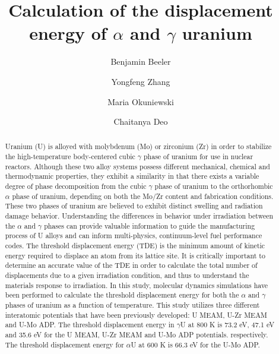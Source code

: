 \documentclass[review]{elsarticle}
\begin{document}
\begin{frontmatter}
\title{Calculation of the displacement energy of $\alpha$ and $\gamma$ uranium}

\author[inl]{Benjamin Beeler}
\author[inl]{Yongfeng Zhang}
\author[pur]{Maria Okuniewski}
\author[gatech]{Chaitanya Deo}
\address[inl]{Idaho National Laboratory, Idaho Falls, ID 83415}
\address[pur]{Purdue University, West Lafayette, IN 47907}
\address[gatech]{Georgia Institute of Technology, Atlanta, GA 30332}

\begin{abstract}

Uranium (U) is alloyed with molybdenum (Mo) or zirconium (Zr) in order to stabilize the high-temperature body-centered cubic $\gamma$ phase of uranium for use in nuclear reactors. Although these two alloy systems possess different mechanical, chemical and thermodynamic properties, they exhibit a similarity in that there exists a variable degree of phase decomposition from the cubic $\gamma$ phase of uranium to the orthorhombic $\alpha$ phase of uranium, depending on both the Mo/Zr content and fabrication conditions. These two phases of uranium are believed to exhibit distinct swelling and radiation damage behavior. Understanding the differences in behavior under irradiation between the $\alpha$ and $\gamma$ phases can provide valuable information to guide the manufacturing process of U alloys and can inform multi-physics, continuum-level fuel performance codes. The threshold displacement energy (TDE) is the minimum amount of kinetic energy required to displace an atom from its lattice site. It is critically important to determine an accurate value of the TDE in order to calculate the total number of displacements due to a given irradiation condition, and thus to understand the materials response to irradiation. In this study, molecular dynamics simulations have been performed to calculate the threshold displacement energy for both the $\alpha$ and $\gamma$ phases of uranium as a function of temperature. This study utilizes three different interatomic potentials that have been previously developed: U MEAM, U-Zr MEAM and U-Mo ADP. The threshold displacement energy in $\gamma$U at 800 K is 73.2 eV, 47.1 eV and 35.6 eV for the U MEAM, U-Zr MEAM and U-Mo ADP potentials. respectively. The threshold displacement energy for $\alpha$U at 600 K is 66.3 eV for the U-Mo ADP. 
\end{abstract}
\end{frontmatter}
\end{document}

